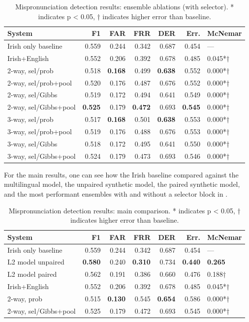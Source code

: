 \documentclass[thesis]{cluu}
\begin{document}
\begin{table}[h]
\centering
\caption{Mispronunciation detection results: ensemble ablations (with selector). * indicates p < 0.05, † indicates higher error than baseline.}
\label{tab:results_ensemble_selector}
\begin{tabular}{lrrrrrl}
\toprule
System & F1 & FAR & FRR & DER & Err. & McNemar \\
\midrule
Irish only baseline & 0.559 & 0.244 & 0.342 & 0.687 & 0.454 & — \\
Irish+English & 0.552 & 0.206 & 0.392 & 0.678 & 0.485 & 0.045*† \\
\midrule
2-way, sel/prob & 0.518 & \textbf{0.168} & 0.499 & \textbf{0.638} & 0.552 & 0.000*† \\
2-way, sel/prob+pool & 0.520 & 0.176 & 0.487 & 0.676 & 0.552 & 0.000*† \\
2-way, sel/Gibbs & 0.519 & 0.172 & 0.494 & 0.641 & 0.549 & 0.000*† \\
2-way, sel/Gibbs+pool & \textbf{0.525} & 0.179 & \textbf{0.472} & 0.693 & \textbf{0.545} & 0.000*† \\
3-way, sel/prob & 0.517 & \textbf{0.168} & 0.501 & \textbf{0.638} & 0.553 & 0.000*† \\
3-way, sel/prob+pool & 0.519 & 0.176 & 0.488 & 0.676 & 0.553 & 0.000*† \\
3-way, sel/Gibbs & 0.518 & 0.172 & 0.495 & 0.641 & 0.550 & 0.000*† \\
3-way, sel/Gibbs+pool & 0.524 & 0.179 & 0.473 & 0.693 & 0.546 & 0.000*† \\
\bottomrule
\end{tabular}
\end{table}

For the main results, one can see how the Irish baseline compared against the multilingual model, the unpaired synthetic model, the paired synthetic model, and the most performant ensembles with and without a selector block in .

\begin{table}[h]
\centering
\caption{Mispronunciation detection results: main comparison. * indicates p < 0.05, † indicates higher error than baseline.}
\label{tab:results_main}
\begin{tabular}{lrrrrrl}
\toprule
System  & F1 & FAR & FRR & DER & Err. & McNemar \\
\midrule
Irish only baseline & 0.559 & 0.244 & 0.342 & 0.687 & 0.454 & — \\
L2 model unpaired & \textbf{0.580} & 0.240 & \textbf{0.310} & 0.734 & \textbf{0.440} & \textbf{0.265} \\
L2 model paired & 0.562 & 0.191 & 0.386 & 0.660 & 0.476 & 0.188† \\
Irish+English & 0.552 & 0.206 & 0.392 & 0.678 & 0.485 & 0.045*† \\
2-way, prob & 0.515 & \textbf{0.130} & 0.545 & \textbf{0.654} & 0.586 & 0.000*† \\
2-way, sel/Gibbs+pool & 0.525 & 0.179 & 0.472 & 0.693 & 0.545 & 0.000*† \\
\bottomrule
\end{tabular}
\end{table}
\end{document}
